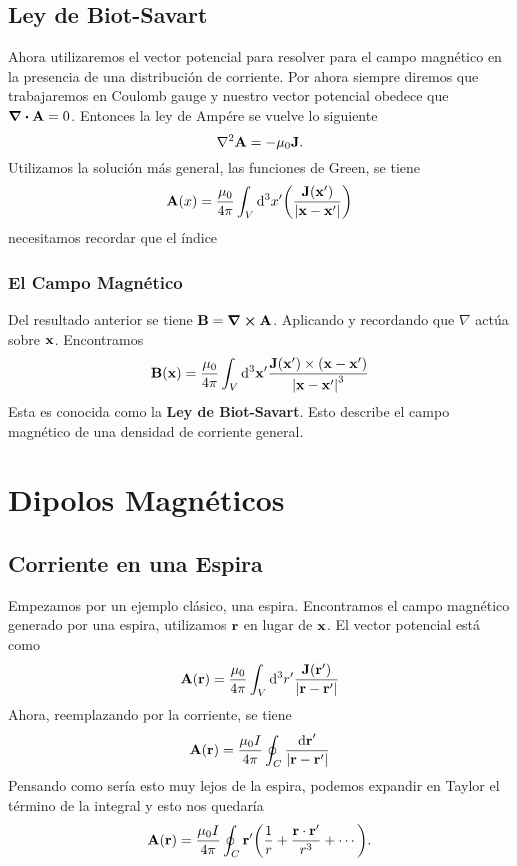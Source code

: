 \subsection{Ley de Biot-Savart}
Ahora utilizaremos el vector potencial para resolver para el campo magnético en la presencia de una distribución de corriente. Por ahora siempre diremos que trabajaremos en Coulomb gauge y nuestro vector potencial obedece que $\div{\vb{A}} = 0$. Entonces la ley de Ampére se vuelve lo siguiente
\begin{equation}
    \laplacian{\vb{A}} = -\muc \vb{J}.
\end{equation}
Utilizamos la solución más general, las funciones de Green, se tiene
\begin{equation}
    \vb{A} (x) = \frac{\mu_0}{4\pi} \int _V \dd ^3 x^\prime \qty(\frac{\vb{J} (\vb{x} ^\prime)}{\abs{\vb{x} - \vb{x} ^\prime}})
\end{equation}
necesitamos recordar que el índice

\subsubsection{El Campo Magnético}
Del resultado anterior se tiene $\vb{B} = \curl{\vb{A}}$. Aplicando y recordando que $\nabla$ actúa sobre $\vb{x}$. Encontramos
\begin{equation}
    \vb{B} (\vb{x}) = \frac{\mu_0}{4\pi} \int _V \dd ^3 \vb{x} ^\prime \frac{\vb{J} (\vb{x} ^\prime) \times (\vb{x} - \vb{x} ^\prime)}{\abs{\vb{x} - \vb{x}^\prime}^3}
\end{equation}
Esta es conocida como la \textbf{Ley de Biot-Savart}. Esto describe el campo magnético de una densidad de corriente general. 



\section{Dipolos Magnéticos}
\subsection{Corriente en una Espira}
Empezamos por un ejemplo clásico, una espira. Encontramos el campo magnético generado por una espira, utilizamos $\vb{r}$ en lugar de $\vb{x}$. El vector potencial está como
\begin{equation}
    \vb{A} (\vb{r}) = \frac{\mu_0}{4\pi} \int _V \dd ^3 r^\prime \frac{\vb{J} (\vb{r^\prime})}{\abs{\vb{r} - \vb{r}^\prime}}
\end{equation}
Ahora, reemplazando por la corriente, se tiene
\begin{equation}
    \vb{A} (\vb{r}) = \frac{\mu_0 I}{4\pi} \oint _C \frac{\dd{\vb{r}}^\prime}{\abs{\vb{r} - \vb{r} ^\prime}}
\end{equation}
Pensando como sería esto muy lejos de la espira, podemos expandir en Taylor el término de la integral y esto nos quedaría
\begin{equation}
    \vb{A} (\vb{r}) = \frac{\mu_0 I}{4\pi} \oint _C \vb{r}^\prime \qty(\frac{1}{r} + \frac{\vb{r} \cdot \vb{r}^\prime}{r^3} + \cdots).
\end{equation}
